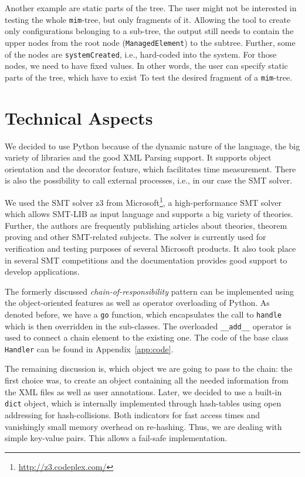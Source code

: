 Another example are static parts of the tree. The user might not be interested in testing the whole \verb|mim|-tree, but only fragments of it. Allowing the tool to create only configurations belonging to a sub-tree, the output still needs to contain the upper nodes from the root node (\verb|ManagedElement|) to the subtree. Further, some of the nodes are \verb|systemCreated|, i.e., hard-coded into the system. For those nodes, we need to have fixed values. In other words, the user can specify static parts of the tree, which have to exist To test the desired fragment of a \verb|mim|-tree.


\section{Technical Aspects}\label{sec:tech}

We decided to use Python because of the dynamic nature of the language, the big variety of libraries and the good XML Parsing support. It supports object orientation and the decorator feature, which facilitates time measurement. There is also the possibility to call external processes, i.e., in our case the SMT solver.


We used the SMT solver z3 from Microsoft\footnote{\url{http://z3.codeplex.com/}}, a high-performance SMT solver which allows SMT-LIB as input language and supports a big variety of theories. Further, the authors are frequently publishing articles about theories, theorem proving and other SMT-related subjects. The solver is currently used for verification and testing purposes of several Microsoft products. It also took place in several SMT competitions and the documentation provides good support to develop applications.

The formerly discussed \emph{chain-of-responsibility} pattern can be implemented using the object-oriented features as well as operator overloading of Python. As denoted before, we have a \verb|go| function, which encapsulates the call to \verb|handle| which is then overridden in the sub-classes. The overloaded \verb|__add__| operator is used to connect a chain element to the existing one. The code of the base class \verb|Handler| can be found in Appendix~\ref{app:code}.


The remaining discussion is, which object we are going to pass to the chain: the first choice was, to create an object containing all the needed information from the XML files as well as user annotations. Later, we decided to use a built-in \verb|dict| object, which is internally implemented through hash-tables using open addressing for hash-collisions. Both indicators for fast access times and vanishingly small memory overhead on re-hashing. Thus, we are dealing with simple key-value pairs. This allows a fail-safe implementation.

